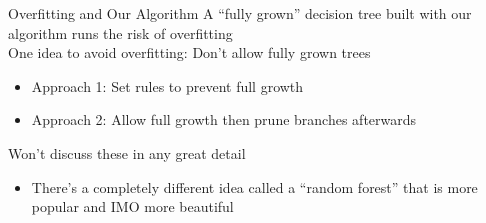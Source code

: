 \documentclass[aspectratio=169]{../latex_main/tntbeamer}  %
\begin{document}
	\begin{frame}{Overfitting and Our Algorithm}
	    A “fully grown” decision tree built with our algorithm runs the risk of overfitting\\
	    \bigskip
	    One idea to avoid overfitting: Don’t allow fully grown trees
	    \begin{itemize}
	        \item Approach 1: Set rules to prevent full growth
	        \item Approach 2: Allow full growth then prune branches afterwards
	    \end{itemize}
	    
        Won’t discuss these in any great detail
        \begin{itemize}
            \item There’s a completely different idea called a “random forest” that is more popular and IMO more beautiful
        \end{itemize}
	\end{frame}
\end{document}
